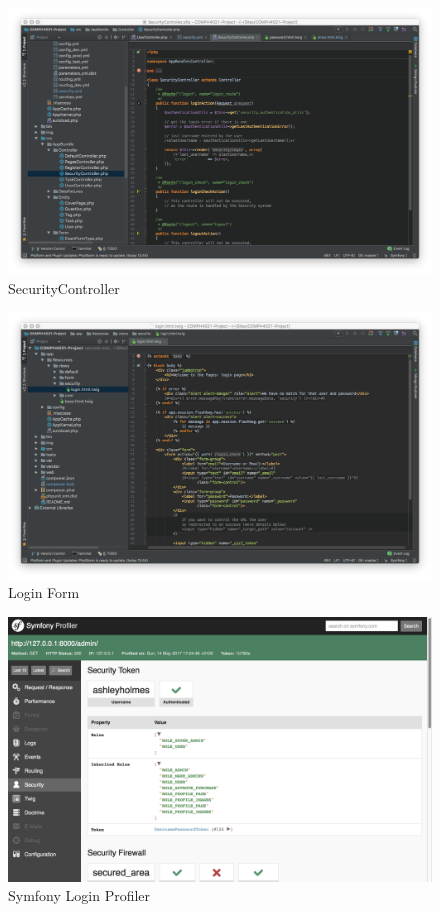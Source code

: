\begin{figure}[htbp]
   \centering
   \includegraphics[width=400pt]{figures/security_controller.png} %
   \caption{SecurityController}
   \label{fig:SecurityController}
\end{figure}

\begin{figure}[htbp]
   \centering
   \includegraphics[width=400pt]{figures/login_html_twig.png} %
   \caption{Login Form}
   \label{fig:Login Form}
\end{figure}

\begin{figure}[htbp]
   \centering
   \includegraphics[width=400pt]{figures/symfony_profiler_login.png} %
   \caption{Symfony Login Profiler}
   \label{fig:Symfony Login Profiler}
\end{figure}

